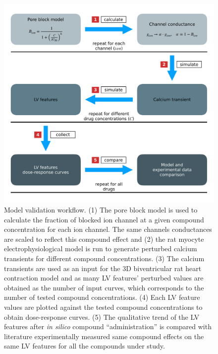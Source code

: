 \begin{figure}[!ht]
    \myfloatalign
    \includegraphics[width=\textwidth]{figures/chapter06/model_validation_schematic.pdf}
    \caption{Model validation workflow. (1) The pore block model is used to calculate the fraction of blocked ion channel at a given compound concentration for each ion channel. The same channels conductances are scaled to reflect this compound effect and (2) the rat myocyte electrophysiological model is run to generate perturbed calcium transients for different compound concentrations. (3) The calcium transients are used as an input for the $3$D biventricular rat heart contraction model and as many LV features' perturbed values are obtained as the number of input curves, which corresponds to the number of tested compound concentrations. (4) Each LV feature values are plotted against the tested compound concentrations to obtain dose-response curves. (5) The qualitative trend of the LV features after \textit{in silico} compound ``administration'' is compared with literature experimentally measured same compound effects on the same LV features for all the compounds under study.}
    \label{fig:validationschematic}
\end{figure}


%
%
%
